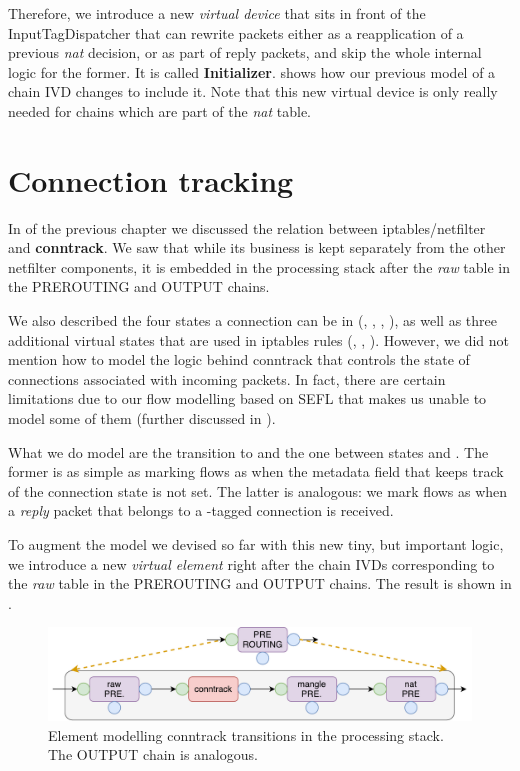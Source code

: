 Therefore, we introduce a new \emph{virtual device} that sits in front of the
InputTagDispatcher that can rewrite packets either as a reapplication of a
previous \emph{nat} decision, or as part of reply packets, and skip the whole
internal logic for the former.  It is called \textbf{Initializer}.
 shows how our previous
model of a chain IVD changes to include it.  Note that this new virtual device
is only really needed for chains which are part of the \emph{nat} table.


\section{Connection tracking}\label{sec:model-conntrack}

In  of the previous chapter we
discussed the relation between iptables/netfilter and \textbf{conntrack}.  We
saw that while its business is kept separately from the other netfilter
components, it is embedded in the processing stack after the \emph{raw} table
in the PREROUTING and OUTPUT chains.

We also described the four states a connection can be in (\NEW, \ESTABLISHED,
\RELATED, \INVALID), as well as three additional virtual states that are used
in iptables rules (\UNTRACKED, \SNAT, \DNAT).  However, we did not mention how
to model the logic behind conntrack that controls the state of connections
associated with incoming packets.  In fact, there are certain limitations due
to our flow modelling based on SEFL that makes us unable to model some of them
(further discussed in ).

What we do model are the transition to \NEW and the one between states \NEW and
\ESTABLISHED.  The former is as simple as marking flows as \NEW when the
metadata field that keeps track of the connection state is not set.  The latter
is analogous: we mark flows as \ESTABLISHED when a \emph{reply} packet that
belongs to a \NEW-tagged connection is received.

To augment the model we devised so far with this new tiny, but important logic,
we introduce a new \emph{virtual element} right after the chain IVDs
corresponding to the \emph{raw} table in the PREROUTING and OUTPUT chains.  The
result is shown in .

\begin{figure}[h]
  \centering
  \captionsetup{justification=centering}
  \includegraphics[scale=0.5]{src/img/conntrack-chain}
  \caption[Element modelling conntrack transitions in the processing
  stack.]{Element modelling conntrack transitions in the processing stack.  The
  OUTPUT chain is analogous.}
  \label{fig:conntrack-chain}
\end{figure}



